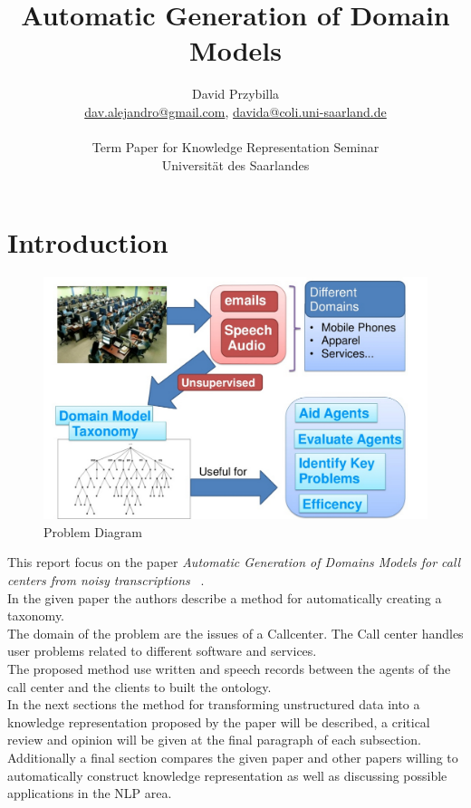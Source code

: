 \documentclass[4pt,a4paper,twocolumn]{article}
\author{David Przybilla\\ \href{mailto:dav.alejandro@gmail.com}{dav.alejandro@gmail.com}, \href{mailto:davida@coli.uni-saarland.de}{davida@coli.uni-saarland.de}\\ \\ Term Paper for Knowledge Representation Seminar\\ Universit\"{a}t des Saarlandes}
\title{Automatic Generation of Domain Models}
\begin{document}
\twocolumn[
	 \begin{@twocolumnfalse}
    \maketitle
  \end{@twocolumnfalse}
 ]




\section{Introduction}


\begin{figure}[]
  \centering
    \includegraphics[scale=0.2]{pics/problem.jpg}
    \caption{Problem Diagram}
   \label{fig:problem}  
\end{figure}



This report focus on the paper \textit{Automatic Generation of Domains Models for call centers from noisy transcriptions} ~\cite{Roy:2006:AGD:1220175.1220268}.\\
In the given paper the authors describe a method for automatically creating a taxonomy.\\
The domain of the problem are the issues of a Callcenter. The Call center handles user problems related to different software and services.\\
The proposed method use  written and speech records between the agents of the call center and the clients to built the ontology. \\
In the next sections  the method for transforming unstructured data into a knowledge representation proposed by the paper will be described, a critical review and opinion will be given at the final paragraph of each subsection. Additionally a final section compares the given paper and other papers willing to automatically construct knowledge representation as well as discussing possible applications in the NLP area.
\end{document}
